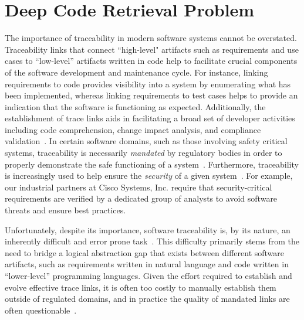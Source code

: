 \section{Deep Code Retrieval Problem}
\label{sec:deep-retrieval-problem}

The importance of traceability in modern software systems cannot be overstated. Traceability links that connect ``high-level" artifacts such as requirements and use cases to ``low-level'' artifacts written in code help to facilitate crucial components of the software development and maintenance cycle. For instance, linking requirements to code provides visibility into a system by enumerating what has been implemented, whereas linking requirements to test cases helps to provide an indication that the software is functioning as expected. Additionally, the establishment of trace links aids in facilitating a broad set of developer activities including code comprehension, change impact analysis, and compliance validation~\citep{Cleland-Huang:Springer'12}.  In certain software domains, such as those involving safety critical systems, traceability is necessarily \textit{mandated} by regulatory bodies in order to properly demonstrate the safe functioning of a system~\citep{Nejati:IST'12,Rempel:ICSE'14,Cleland-Huang:ICSE'10,Mader:Soft'13}. Furthermore, traceability is increasingly used to help ensure the \textit{security} of a given system~\citep{Nhlabatsi:SST'15}. For example, our industrial partners at Cisco Systems, Inc. require that security-critical requirements are verified by a dedicated group of analysts to avoid software threats and ensure best practices. 

Unfortunately, despite its importance, software traceability is, by its nature, an inherently difficult and error prone task~\citep{Cleland-Huang:FOSE'14,Mahmoud:ICPC'12,Mader:Soft'13}. This difficulty primarily stems from the need to bridge a logical abstraction gap that exists between different software artifacts, such as requirements written in natural language and code written in ``lower-level'' programming languages.  %
Given the effort required to establish and evolve effective trace links, it is often too costly to manually establish them outside of regulated domains, and in practice the quality of mandated links are often questionable~\citep{Cleland-Huang:FSE'14}.  

